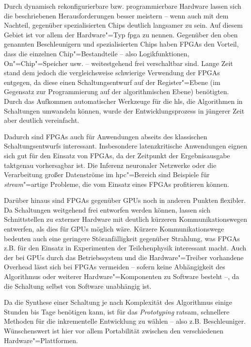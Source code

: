 Durch dynamisch rekonfigurierbare bzw. programmierbare Hardware lassen sich die
beschriebenen Herausforderungen besser meistern -- wenn auch mit dem Nachteil,
gegenüber spezialisierten Chips deutlich langsamer zu sein. Auf diesem Gebiet
ist vor allem der Hardware"=Typ \gls{fpga} zu nennen. Gegenüber den oben
genannten Beschleunigern und spezialisierten Chips haben FPGAs den Vorteil, dass
die einzelnen Chip"=Bestandteile -- also Logikfunktionen, On"=Chip"=Speicher
usw. -- weitestgehend frei verschaltbar sind. 
Lange Zeit stand dem jedoch die vergleichsweise schwierige Verwendung der
FPGAs entgegen, da diese einen Schaltungsentwurf auf der Register"=Ebene (im
Gegensatz zur Programmierung auf der algorithmischen Ebene) benötigten. Durch
das Aufkommen automatischer Werkzeuge für die \gls{hls}, die Algorithmen in
Schaltungen umwandeln können, wurde der Entwicklungsprozess in jüngerer Zeit
aber deutlich vereinfacht.

Dadurch sind FPGAs auch für Anwendungen abseits des klassischen
Schaltungsentwurfs interessant. Insbesondere latenzkritische Anwendungen eignen
sich gut für den Einsatz von FPGAs, da der Zeitpunkt der Ergebnisausgabe
taktgenau vorhersagbar ist. Die Inferenz neuronaler Netzwerke oder die
Verarbeitung großer Datenströme im \gls{hpc}"=Bereich sind Beispiele für
\textit{stream}"=artige Probleme, die vom Einsatz eines FPGAs profitieren
können.

Darüber hinaus sind FPGAs gegenüber GPUs noch in anderen Punkten flexibler. Da
Schaltungen weitgehend frei entworfen werden können, lassen sich Schnittstellen
zu externer Hardware mit deutlich kürzeren Kommunikationswegen entwerfen, als
dies für GPUs möglich wäre. Kürzere Kommunikationswege bedeuten auch eine
geringere Störanfälligkeit gegenüber Strahlung, was FPGAs z.B. für den Einsatz
in Experimenten der Teilchenphysik interessant macht. Auch der bei GPUs durch
das Betriebssystem und die Hardware"=Treiber vorhandene Overhead lässt sich bei
FPGAs vermeiden -- sofern keine Abhängigkeit des Algorithmus oder weiterer
Hardware"=Komponenten zu Software besteht --, da die Schaltung selbst von
Software unabhängig ist.

Da die Synthese einer Schaltung je nach Komplexität des Algorithmus einige
Stunden bis Tage benötigen kann, ist für das \textit{Prototyping} ratsam,
schnellere Methoden für die inkrementelle Entwicklung zu wählen -- also z.B.
Beschleuniger. Wünschenswert ist hier vor allem Portabilität zwischen den
verschiedenen Hardware"=Plattformen.

